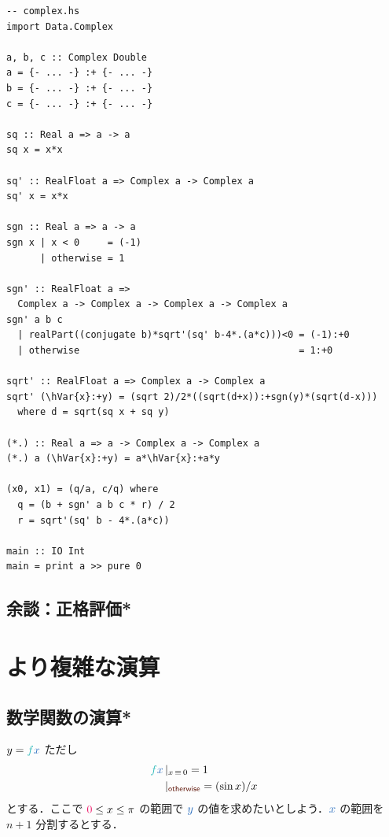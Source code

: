 \documentclass[a5paper,twoside,fleqn,draft]{jsbook}
\begin{document}
\begin{haskellcode}
\begin{verbatim}
-- complex.hs
import Data.Complex

a, b, c :: Complex Double
a = {- ... -} :+ {- ... -}
b = {- ... -} :+ {- ... -}
c = {- ... -} :+ {- ... -}

sq :: Real a => a -> a
sq x = x*x

sq' :: RealFloat a => Complex a -> Complex a
sq' x = x*x

sgn :: Real a => a -> a
sgn x | x < 0     = (-1)
      | otherwise = 1

sgn' :: RealFloat a =>
  Complex a -> Complex a -> Complex a -> Complex a
sgn' a b c
  | realPart((conjugate b)*sqrt'(sq' b-4*.(a*c)))<0 = (-1):+0
  | otherwise                                       = 1:+0

sqrt' :: RealFloat a => Complex a -> Complex a
sqrt' (\hVar{x}:+y) = (sqrt 2)/2*((sqrt(d+x)):+sgn(y)*(sqrt(d-x)))
  where d = sqrt(sq x + sq y)

(*.) :: Real a => a -> Complex a -> Complex a
(*.) a (\hVar{x}:+y) = a*\hVar{x}:+a*y

(x0, x1) = (q/a, c/q) where
  q = (b + sgn' a b c * r) / 2
  r = sqrt'(sq' b - 4*.(a*c))

main :: IO Int
main = print a >> pure 0
\end{verbatim}
\end{haskellcode}

\section{余談：正格評価*}



\chapter{より複雑な演算}
\label{ch:more-arithmetic}

\section{数学関数の演算*}

$y=\hFunc{f}\hVar{x}$ ただし
\begin{equation}
\begin{aligned}
\hFunc{f}\hVar{x}&\hGuard{x\hIfEq0}=1\\
&\hGuard{\hOtherwise}=(\sin x)/x
\end{aligned}
\end{equation}
とする．ここで $\hConstant{0}\le x\le\pi$ の範囲で $\hVar{y}$ の値を求めたいとしよう．$\hVar{x}$
の範囲を $n+1$ 分割するとする．
\end{document}
